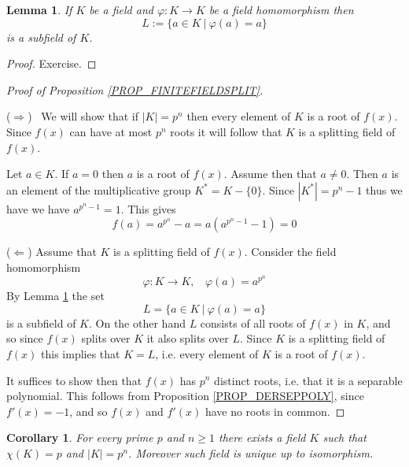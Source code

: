 \documentclass[12pt, letterpaper, oneside]{article}
\theoremstyle{plain}
\newtheorem{lemma}[theorem]{Lemma}
\newtheorem{corollary}[theorem]{Corollary}
\theoremstyle{definition}
\newcommand{\vs}{\vskip 5mm}
\begin{document}
\vs\vs

\begin{lemma}
\label{LEMMA_AUTOFIXEDSUBF}
If $K$ be a field and  $\varphi\colon K \to K$ be a field homomorphism then 
$$L := \{ a\in K \ | \ \varphi(a) = a \}$$
is a subfield of $K$. 
\end{lemma}

\vs

\begin{proof}
Exercise. 
\end{proof}


\vs\vs


\begin{proof}[Proof of Proposition \ref{PROP_FINITEFIELDSPLIT}] \  

($\Rightarrow$) \  We will show that if $|K|= p^{n}$ then every element of $K$
is a root of $f(x)$. Since $f(x)$ can have at most $p^{n}$ roots it will follow that 
$K$ is a splitting field of $f(x)$.

Let $a\in K$. If $a = 0$ then $a$ is a root of $f(x)$. Assume then that $a\neq 0$. 
Then $a$ is an element of the multiplicative group $K^{\ast} = K - \{0\}$.  
Since $|K^{\ast}| = p^{n}-1$ thus we have  we have $a^{p^{n}-1} =1$.  This 
gives 
$$f(a) = a^{p^{n}} - a = a(a^{p^{n}-1} -1)  = 0$$


\vs

($\Leftarrow$) Assume that $K$ is a splitting field of $f(x)$. Consider
the field homomorphism 
$$\varphi\colon K \to K, \ \ \ \ \varphi(a) = a^{p^{n}}$$
By Lemma \ref{LEMMA_AUTOFIXEDSUBF} the set 
$$L = \{ a\in K \ | \ \varphi(a) = a \}$$
is a subfield of $K$. On the other hand  $L$ consists of all roots of $f(x)$ in $K$, 
and so since $f(x)$ splits over $K$ it also splits over $L$.  Since $K$ is a splitting 
field of $f(x)$ this implies that $K=L$, i.e. every element of $K$ is a root of $f(x)$. 

It suffices to show then that $f(x)$ has $p^{n}$ distinct roots, i.e. that it is a separable 
polynomial. This follows from Proposition \ref{PROP_DERSEPPOLY}, since $f'(x) =-1$,
and so $f(x)$ and $f'(x)$ have no roots in common. 
\end{proof}



\vs\vs

\begin{corollary}
For every prime $p$ and $n\geq 1$ there exists a field $K$ such that $\chi(K) = p$ and 
$|K| = p^{n}$. Moreover such field is unique up to isomorphism.  
\end{corollary}
\end{document}
